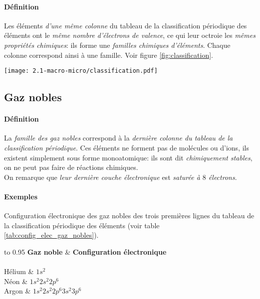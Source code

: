 \paragraph{Définition} Les éléments \textit{d'une même colonne} du tableau de la classification
périodique des éléments ont le \textit{même nombre d'électrons de valence}, ce qui leur octroie 
les \textit{mêmes propriétés chimiques}: ils forme une \textit{familles chimiques d'éléments}. Chaque colonne 
correspond ainsi à une famille. Voir figure \ref{fig:classification}.
\begin{figure*}[!h]
    \begin{center}
	\texttt{[image: 2.1-macro-micro/classification.pdf]}
    \end{center}
    \caption{Les trois premières lignes de la classification périodique. Chaque ligne correspond au remplissage d'une couche électronique, les éléments d'une colonne ont le même nombre d'électrons de valence, les électrons de la dernière couche remplie.}
    \label{fig:classification}
\end{figure*}


\subsection{Gaz nobles}
\paragraph{Définition} La \textit{famille des gaz nobles} correspond à la \textit{dernière colonne du tableau de la
classification périodique}. Ces éléments ne forment pas de molécules ou d'ions, ils existent simplement
sous forme monoatomique: ils sont dit \textit{chimiquement stables}, on ne peut pas faire de réactions chimiques.\\
On remarque que \textit{leur dernière couche électronique} est \textit{saturée à $8$ électrons}.
\paragraph{Exemples} Configuration électronique des gaz nobles des trois premières lignes du tableau de la
classification périodique des éléments (voir table \ref{tab:config_elec_gaz_nobles}).

\begin{table}[!h]
  \centering
  \begin{tabu} to 0.95\columnwidth { X[l] X[2,l] }
      \hline 
      \textbf{Gaz noble} & \textbf{Configuration électronique} \\
      \hline \\[-10pt]
	Hélium & $1s^2$\\
	Néon & $1s^2 2s^2 2p^{6}$\\
	Argon & $1s^2 2s^2 2p^{6} 3s^2 3p^{6}$\\
      \hline      
  \end{tabu}
  \caption{Configuration électronique des gaz nobles. On observe sur la dernière couche remplie
  qu'il y a $8$ électrons: $2$ sur la sous couche $s$ et $6$ sur la sous couche $p$.}
  \label{tab:config_elec_gaz_nobles}
\end{table}

